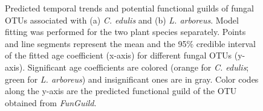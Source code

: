 \clearpage
\begin{figure}[h]
	\vspace*{-1cm}
	\centering
	\caption[Predicted temporal trends and potential functional guilds of fungal OTUs associated with \textit{C. edulis} and \textit{L. arboreus}.]
		{\hspace{1mm} Predicted temporal trends and potential functional guilds of fungal OTUs associated with (a) \textit{C. edulis} and (b) \textit{L. arboreus}. Model fitting was performed for the two plant species separately. Points and line segments represent the mean and the 95$\%$ credible interval of the fitted age coefficient (x-axis) for different fungal OTUs (y-axis). Significant age coefficients are colored (orange for \textit{C. edulis}; green for \textit{L. arboreus}) and insignificant ones are in gray. Color codes along the y-axis are the predicted functional guild of the OTU obtained from \textit{FunGuild}.}
	\label{fig:Funguild_HMSC_Species_Individual_Full2015}
\end{figure}

